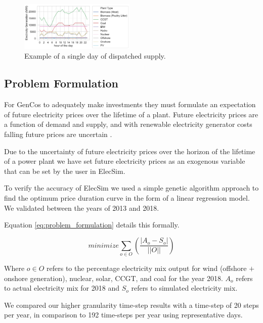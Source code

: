 \documentclass[final,3p,times,twocolumn,numbers]{elsarticle}
\begin{document}
\begin{figure}
\centering
\includegraphics[width=0.49\textwidth]{figures/methods_and_materials/clusters_results_single_day.pdf}
\caption{Example of a single day of dispatched supply.}
\label{fig:single_dispatched_day}
\end{figure}
 
\subsection{Problem Formulation}

For GenCos to adequately make investments they must formulate an expectation of future electricity prices over the lifetime of a plant. Future electricity prices are a function of demand and supply, and with renewable electricity generator costs falling future prices are uncertain \cite{IRENA2014}. 

Due to the uncertainty of future electricity prices over the horizon of the lifetime of a power plant we have set future electricity prices as an exogenous variable that can be set by the user in ElecSim.

To verify the accuracy of ElecSim we used a simple genetic algorithm approach to find the optimum price duration curve in the form of a linear regression model. We validated between the years of 2013 and 2018.

Equation \ref{eq:problem_formulation} details this formally.

\begin{equation}
	\label{eq:problem_formulation}
	minimize \sum\limits_{o\in O}\left(
	\frac{\left|A_o-S_o\right|}
	{\left|\left|O\right|\right|}
	\right)
\end{equation}

Where $o\in O$ refers to the percentage electricity mix output for wind (offshore $+$ onshore generation), nuclear, solar, CCGT, and coal for the year 2018. $A_o$ refers to actual electricity mix for 2018 and $S_o$ refers to simulated electricity mix.

We compared our higher granularity time-step results with a time-step of 20 steps per year, in comparison to 192 time-steps per year using representative days.
\end{document}
